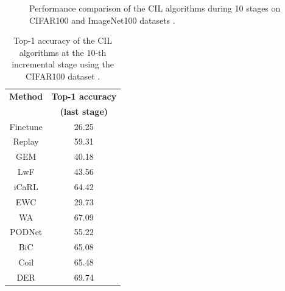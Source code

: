 \begin{figure}%
	\centering
	\hfill
	\caption{Performance comparison of the CIL algorithms during 10 stages on CIFAR100 and ImageNet100 datasets \cite{zhou2021pycil}.}%
	\label{fig:cil-comaprison}%
\end{figure}

\begin{table}
    \centering
    \begin{tabular}{c c} 
     \hline
     \textbf{Method} & \textbf{Top-1 accuracy} \\
     & \textbf{(last stage)}\\
     \hline
     Finetune & 26.25 \\ 
    Replay & 59.31 \\ 
    GEM & 40.18 \\ 
    LwF & 43.56 \\ 
    iCaRL & 64.42 \\ 
    EWC & 29.73 \\ 
    WA & 67.09 \\ 
    PODNet & 55.22 \\ 
    BiC & 65.08 \\ 
    Coil & 65.48 \\ 
    DER & 69.74 \\ 

     \hline
    \end{tabular}
    \caption{Top-1 accuracy of the CIL algorithms at the $10$-th incremental stage using the CIFAR100 dataset \cite{zhou2021pycil}.}
    \label{table:cil-results}
    \end{table}

